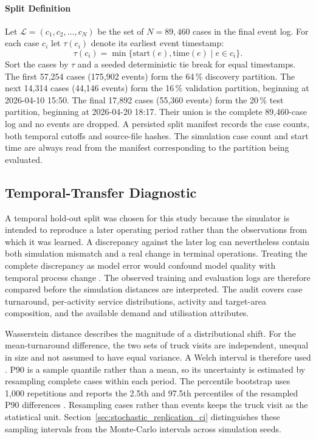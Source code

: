 \paragraph{Split Definition}
\label{sec:split_definition}

Let $\mathcal{L}=(c_1,c_2,\dots,c_N)$ be the set of $N=89{,}460$ cases
in the final event log. For each case $c_i$ let $\tau(c_i)$ denote its
earliest event timestamp:
\begin{equation}
    \tau(c_i)=\min\bigl\{
      \text{start}(e),\text{time}(e)
      \mid e\in c_i \bigr\}.
\end{equation}
Sort the cases by $\tau$ and a seeded deterministic tie break for equal
timestamps. The first 57,254 cases (175,902 events) form the 64\,\% discovery
partition. The next 14,314 cases (44,146 events) form the 16\,\% validation
partition, beginning at 2026-04-10 15:50. The final 17,892 cases (55,360
events) form the 20\,\% test partition, beginning at 2026-04-20 18:17. Their
union is the complete 89,460-case log and no events are dropped. A persisted
split manifest records the case counts, both temporal cutoffs and source-file
hashes. The simulation case count and start time are always read from the
manifest corresponding to the partition being evaluated.

\subsection{Temporal-Transfer Diagnostic}
\label{sec:temporal_transfer_method}

A temporal hold-out split was chosen for this study because the simulator is
intended to reproduce a later operating period rather than the observations
from which it was learned. A discrepancy against the later log can nevertheless
contain both simulation mismatch and a real change in terminal operations.
Treating the complete discrepancy as model error would confound model quality
with temporal process change \cite{Ozdemir2025UtilityBPS}. The observed
training and evaluation logs are therefore compared before the simulation
distances are interpreted. The audit covers case turnaround, per-activity
service distributions, activity and target-area composition, and the available
demand and utilisation attributes.

Wasserstein distance describes the magnitude of a distributional shift. For
the mean-turnaround difference, the two sets of truck visits are independent,
unequal in size and not assumed to have equal variance. A Welch interval is
therefore used \cite{Welch1947}. P90 is a sample quantile rather than a mean, so
its uncertainty is estimated by resampling complete cases within each period.
The percentile bootstrap uses 1,000 repetitions and reports the 2.5th and
97.5th percentiles of the resampled P90 differences
\cite{EfronTibshirani1993}. Resampling cases rather than events keeps the truck
visit as the statistical unit. Section~\ref{sec:stochastic_replication_ci}
distinguishes these sampling intervals from the Monte-Carlo intervals across
simulation seeds.

